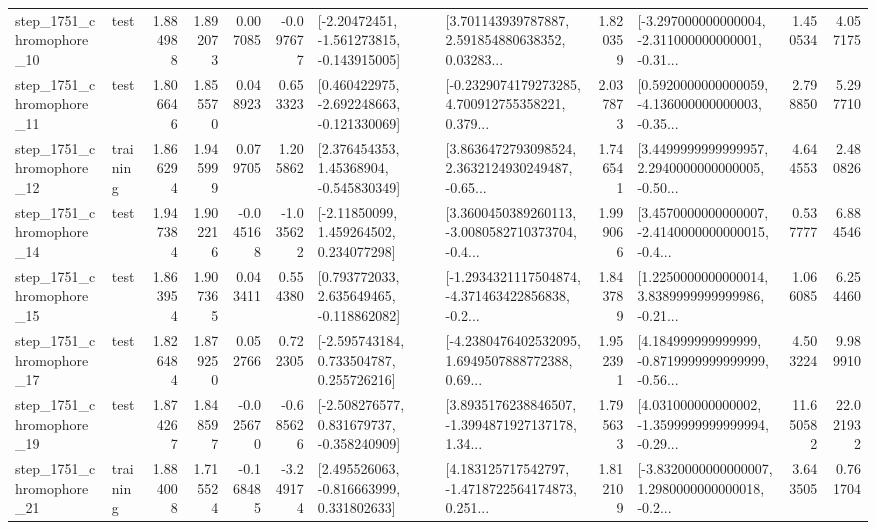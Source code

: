 \begin{tabular}{llrrrrllrlrr}
 step\_1751\_chromophore\_10 &      test &      1.884988 &    1.892073 &      0.007085 & -0.097677 &   [-2.20472451, -1.561273815, -0.143915005] &  [3.701143939787887, 2.591854880638352, 0.03283... &       1.820359 &  [-3.297000000000004, -2.311000000000001, -0.31... &            1.450534 &          4.057175 \\
 step\_1751\_chromophore\_11 &      test &      1.806646 &    1.855570 &      0.048923 &  0.653323 &   [0.460422975, -2.692248663, -0.121330069] &  [-0.2329074179273285, 4.700912755358221, 0.379... &       2.037873 &  [0.5920000000000059, -4.136000000000003, -0.35... &            2.798850 &          5.297710 \\
 step\_1751\_chromophore\_12 &  training &      1.866294 &    1.945999 &      0.079705 &  1.205862 &     [2.376454353, 1.45368904, -0.545830349] &  [3.8636472793098524, 2.3632124930249487, -0.65... &       1.746541 &  [3.4499999999999957, 2.2940000000000005, -0.50... &            4.644553 &          2.480826 \\
 step\_1751\_chromophore\_14 &      test &      1.947384 &    1.902216 &     -0.045168 & -1.035622 &     [-2.11850099, 1.459264502, 0.234077298] &  [3.3600450389260113, -3.0080582710373704, -0.4... &       1.999066 &  [3.4570000000000007, -2.4140000000000015, -0.4... &            0.537777 &          6.884546 \\
 step\_1751\_chromophore\_15 &      test &      1.863954 &    1.907365 &      0.043411 &  0.554380 &    [0.793772033, 2.635649465, -0.118862082] &  [-1.2934321117504874, -4.371463422856838, -0.2... &       1.843789 &  [1.2250000000000014, 3.8389999999999986, -0.21... &            1.066085 &          6.254460 \\
 step\_1751\_chromophore\_17 &      test &      1.826484 &    1.879250 &      0.052766 &  0.722305 &    [-2.595743184, 0.733504787, 0.255726216] &  [-4.2380476402532095, 1.6949507888772388, 0.69... &       1.952391 &  [4.184999999999999, -0.8719999999999999, -0.56... &            4.503224 &          9.989910 \\
 step\_1751\_chromophore\_19 &      test &      1.874267 &    1.848597 &     -0.025670 & -0.685626 &   [-2.508276577, 0.831679737, -0.358240909] &  [3.8935176238846507, -1.3994871927137178, 1.34... &       1.795633 &  [4.031000000000002, -1.3599999999999994, -0.29... &           11.650582 &         22.021932 \\
 step\_1751\_chromophore\_21 &  training &      1.884008 &    1.715524 &     -0.168485 & -3.249174 &    [2.495526063, -0.816663999, 0.331802633] &  [4.183125717542797, -1.4718722564174873, 0.251... &       1.812109 &  [-3.8320000000000007, 1.2980000000000018, -0.2... &            3.643505 &          0.761704 \\

\end{tabular}
